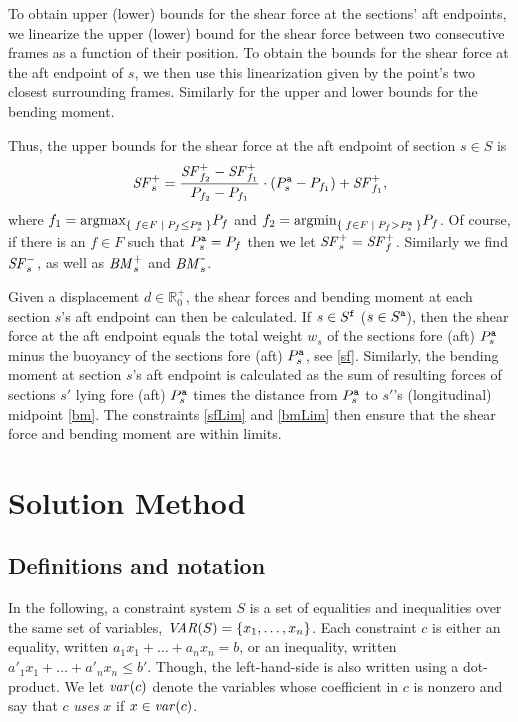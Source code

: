 To obtain upper (lower) bounds for the shear force at the sections' aft endpoints,  
we linearize the upper (lower) bound for the shear force between two consecutive frames as a function of their position. To obtain the bounds for the shear force at the aft endpoint of $s$, we then use this linearization given by the point's two closest surrounding frames. Similarly for the upper and lower bounds for the bending moment.

Thus, the upper bounds for the shear force at the aft endpoint of section $s\in S$ is
\[
\mathit{SF}^+_s = \frac{\mathit{SF}^+_{f_2}-\mathit{SF}^+_{f_1}}{P_{f_2}-P_{f_1}}\cdot(P^{\texttt{a}}_s - P_{f_1}) + \mathit{SF}^+_{f_1}, 
\]
where $f_1 = \text{argmax}_{\{\;{f\in F}\;|\;{P_f\leq P^{\texttt{a}}_s}\;\}}P_f$ and $f_2 = \text{argmin}_{\{\;{f\in F}\;|\;{P_f>P^{\texttt{a}}_s}\;\}}P_f$. Of course, if there is an $f\in F$ such that $P^{\texttt{a}}_s = P_f$ then we let $\mathit{SF}^+_s = \mathit{SF}^+_f$. Similarly we find $\mathit{SF}^-_s$, as well as $\mathit{BM}^+_s$ and $\mathit{BM}^{\texttt{-}}_s$.   

Given a displacement $d\in\mathbb{R}^+_0$, the shear forces and bending moment at each section $s$'s aft endpoint can then be calculated. If $s\in S^{\texttt{f}}$ ($s\in S^{\texttt{a}}$), then the shear force at the aft endpoint equals the total weight $w_s$ of the sections fore (aft) $P^{\texttt{a}}_s$ minus the buoyancy of the sections fore (aft) $P^{\texttt{a}}_s$, see \eqref{sf}.   
%
Similarly, the bending moment at section $s$'s aft endpoint is calculated as the sum of resulting forces of sections $s'$ lying fore (aft) $P^{\texttt{a}}_s$ times the distance from $P^{\texttt{a}}_s$ to $s'$'s (longitudinal) midpoint \eqref{bm}. The constraints \eqref{sfLim} and \eqref{bmLim} then ensure that the shear force and bending moment are within limits.

\section{Solution Method}
\subsection{Definitions and notation}\label{sec:defs}
In the following, a constraint system $S$ is a set of equalities and inequalities over the same set of variables, $\mathit{VAR}(S)=\{x_1,\ldots, x_n\}$. 
Each constraint $c$ is either an equality, written $a_1x_1 + \ldots +a_nx_n = b$, or an inequality, written $a'_1x_1 + \ldots +a'_nx_n\leq b'$. Though, the left-hand-side is also written using a dot-product. 
%
We let $\mathit{var}(c)$ denote the variables whose coefficient in $c$ is nonzero and say that $c$ \emph{uses} $x$ if $x\in \mathit{var}(c)$.

